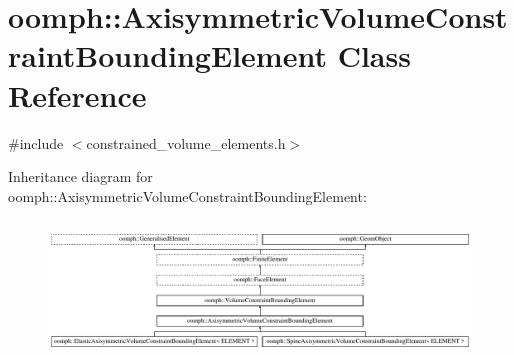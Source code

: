 \hypertarget{classoomph_1_1AxisymmetricVolumeConstraintBoundingElement}{}\section{oomph\+:\+:Axisymmetric\+Volume\+Constraint\+Bounding\+Element Class Reference}
\label{classoomph_1_1AxisymmetricVolumeConstraintBoundingElement}


{\ttfamily \#include $<$constrained\+\_\+volume\+\_\+elements.\+h$>$}

Inheritance diagram for oomph\+:\+:Axisymmetric\+Volume\+Constraint\+Bounding\+Element\+:\begin{figure}[H]
\begin{center}
\leavevmode
\includegraphics[height=3.716814cm]{classoomph_1_1AxisymmetricVolumeConstraintBoundingElement}
\end{center}
\end{figure}
